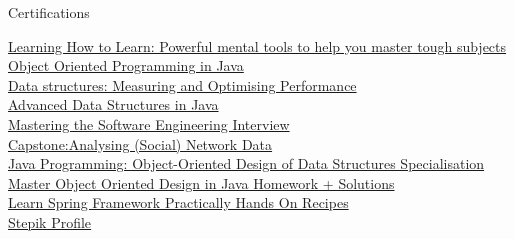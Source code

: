 \documentclass{resume} %
\begin{document}
\newpage

\begin{rSection}{Certifications}

\href{https://www.coursera.org/account/accomplishments/verify/W8EXDYYYEVQU}{Learning How to Learn: Powerful mental tools to help you master tough subjects} \\
\href{https://www.coursera.org/account/accomplishments/verify/UL8495ETRA74}{Object Oriented Programming in Java} \\
\href{https://www.coursera.org/account/accomplishments/verify/CBLS952ZRT4Q}{Data structures: Measuring and Optimising Performance} \\
\href{https://www.coursera.org/account/accomplishments/verify/LN3AZ7DBPR66}{Advanced Data Structures in Java} \\
\href{https://www.coursera.org/account/accomplishments/verify/K3T33584K6EE}{Mastering the Software Engineering Interview} \\
\href{https://www.coursera.org/account/accomplishments/verify/LY7LV3DC8XGX}{Capstone:Analysing (Social) Network Data} \\
\href{https://www.coursera.org/account/accomplishments/specialization/Q43UK3TYBDBT}{Java Programming: Object-Oriented Design of Data Structures Specialisation} \\
\href{https://www.udemy.com/certificate/UC-94P2RWQ1/}{Master Object Oriented Design in Java \- Homework + Solutions} \\
\href{https://www.udemy.com/certificate/UC-WQZIGC8O/}{Learn Spring Framework Practically \- Hands On Recipes} \\
\href{https://stepik.org/users/30653559}{Stepik Profile}

\end{rSection}


\end{document}
